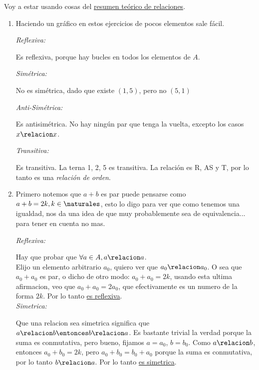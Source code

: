 Voy a estar usando cosas del \hyperlink{teoria-1:relaciones}{resumen teórico de relaciones}.

\begin{enumerate}[label=\roman*)]
  \item Haciendo un gráfico en estos ejercicios de pocos elementos sale fácil.

        \begin{minipage}{0.60\textwidth}
          \textit{Reflexiva:}

          Es reflexiva, porque hay bucles en todos los elementos de $A$.

          \textit{Simétrica:}

          No es simétrica, dado que existe $(1, 5)$, pero no $(5, 1)$

          \textit{Anti-Simétrica:}

          Es antisimétrica. No hay ningún par que tenga la vuelta, excepto los casos $x \relacion x$.

          \textit{Transitiva:}

          Es transitiva. La terna 1, 2, 5 es transitiva.
          La relación es R, AS y T, por lo tanto es una \textit{relación de orden}.
        \end{minipage}
        \begin{minipage}{0.3\textwidth}
          \quad  \veintidosi
        \end{minipage}

  \item Primero notemos que $a + b$ es par puede pensarse como $a + b = 2k, k \in \naturales$, esto lo digo
        para ver que como tenemos una igualdad, nos da una idea de que muy probablemente sea de equivalencia... para tener en cuenta no mas.

        \textit{Reflexiva:}

        Hay que probar que $\forall a \in A, a \relacion a$. \\
        Elijo un elemento arbitrario $a_0$, quiero ver que $a_0 \relacion a_0$. O sea que $a_0 + a_0$ es par, o
        dicho de otro modo: $a_0 + a_0 = 2k$, usando esta ultima afirmacion, veo que $a_0 + a_0 = 2a_0$, que efectivamente
        es un numero de la forma $2k$. Por lo tanto \underline{es reflexiva}. \\

        \textit{Simetrica: }

        Que una relacion sea simetrica significa que $a \relacion b \entonces b \relacion a$.
        Es bastante trivial la verdad porque la suma es conmutativa, pero bueno, fijamos $a = a_0$, $b = b_0$.
        Como $a \relacion b$, entonces $a_0 + b_0 = 2k$, pero $a_0 + b_0 = b_0 + a_0$ porque la suma es conmutativa,
        por lo tanto $b \relacion a$. Por lo tanto \underline{es simetrica}. \\


\end{enumerate}
